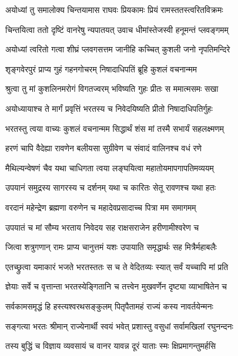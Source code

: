 
\twolineshloka
{अयोध्यां तु समालोक्य चिन्तयामास राघवः}
{प्रियकामः प्रियं रामस्ततस्त्वरितविक्रमः} %

\twolineshloka
{चिन्तयित्वा ततो दृष्टिं वानरेषु न्यपातयत्}
{उवाच धीमांस्तेजस्वी हनूमन्तं प्लवङ्गमम्} %

\twolineshloka
{अयोध्यां त्वरितो गत्वा शीघ्रं प्लवगसत्तम}
{जानीहि कच्चित् कुशली जनो नृपतिमन्दिरे} %

\twolineshloka
{शृङ्गवेरपुरं प्राप्य गुहं गहनगोचरम्}
{निषादाधिपतिं ब्रूहि कुशलं वचनान्मम} %

\twolineshloka
{श्रुत्वा तु मां कुशलिनमरोगं विगतज्वरम्}
{भविष्यति गुहः प्रीतः स ममात्मसमः सखा} %

\twolineshloka
{अयोध्यायाश्च ते मार्गं प्रवृत्तिं भरतस्य च}
{निवेदयिष्यति प्रीतो निषादाधिपतिर्गुहः} %

\twolineshloka
{भरतस्तु त्वया वाच्यः कुशलं वचनान्मम}
{सिद्धार्थं शंस मां तस्मै सभार्यं सहलक्ष्मणम्} %

\twolineshloka
{हरणं चापि वैदेह्या रावणेन बलीयसा}
{सुग्रीवेण च संवादं वालिनश्च वधं रणे} %

\twolineshloka
{मैथिल्यन्वेषणं चैव यथा चाधिगता त्वया}
{लङ्घयित्वा महातोयमापगापतिमव्ययम्} %

\twolineshloka
{उपयानं समुद्रस्य सागरस्य च दर्शनम्}
{यथा च कारितः सेतू रावणश्च यथा हतः} %

\twolineshloka
{वरदानं महेन्द्रेण ब्रह्मणा वरुणेन च}
{महादेवप्रसादाच्च पित्रा मम समागमम्} %

\twolineshloka
{उपयातं च मां सौम्य भरताय निवेदय}
{सह राक्षसराजेन हरीणामीश्वरेण च} %

\twolineshloka
{जित्वा शत्रुगणान् रामः प्राप्य चानुत्तमं यशः}
{उपायाति समृद्धार्थः सह मित्रैर्महाबलैः} %

\twolineshloka
{एतच्छ्रुत्वा यमाकारं भजते भरतस्ततः}
{स च ते वेदितव्यः स्यात् सर्वं यच्चापि मां प्रति} %

\twolineshloka
{ज्ञेयाः सर्वे च वृत्तान्ता भरतस्येङ्गितानि च}
{तत्त्वेन मुखवर्णेन दृष्ट्या व्याभाषितेन च} %

\twolineshloka
{सर्वकामसमृद्धं हि हस्त्यश्वरथसङ्कुलम्}
{पितृपैतामहं राज्यं कस्य नावर्तयेन्मनः} %

\twolineshloka
{सङ्गत्या भरतः श्रीमान् राज्येनार्थी स्वयं भवेत्}
{प्रशास्तु वसुधां सर्वामखिलां रघुनन्दनः} %

\twolineshloka
{तस्य बुद्धिं च विज्ञाय व्यवसायं च वानर}
{यावन्न दूरं याताः स्मः क्षिप्रमागन्तुमर्हसि} %

